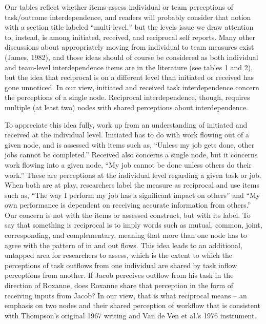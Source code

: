 \documentclass[english,,man]{apa6}
\theoremstyle{definition}
\theoremstyle{definition}
\theoremstyle{definition}
\theoremstyle{remark}
\begin{document}
Our tables reflect whether items assess individual or team perceptions
of task/outcome interdependence, and readers will probably consider that
notion with a section title labeled \enquote{multi-level,} but the
levels issue we draw attention to, instead, is among initiated,
received, and reciprocal self reports. Many other discussions about
appropriately moving from individual to team measures exist (James,
1982), and those ideas should of course be considered as both individual
and team-level interdependence items are in the literature (see tables 1
and 2), but the idea that reciprocal is on a different level than
initiated or received has gone unnoticed. In our view, initiated and
received task interdependence concern the perceptions of a single node.
Reciprocal interdependence, though, requires multiple (at least two)
nodes with shared perceptions about interdependence.

To appreciate this idea fully, work up from an understanding of
initiated and received at the individual level. Initiated has to do with
work flowing out of a given node, and is assessed with items such as,
\enquote{Unless my job gets done, other jobs cannot be completed.}
Received also concerns a single node, but it concerns work flowing into
a given node, \enquote{My job cannot be done unless others do their
work.} These are perceptions at the individual level regarding a given
task or job. When both are at play, researchers label the measure as
reciprocal and use items such as, \enquote{The way I perform my job has
a significant impact on others} and \enquote{My own performance is
dependent on receiving accurate information from others.} Our concern is
not with the items or assessed construct, but with its label. To say
that something is reciprocal is to imply words such as mutual, common,
joint, corresponding, and complementary, meaning that more than one node
has to agree with the pattern of in and out flows. This idea leads to an
additional, untapped area for researchers to assess, which is the extent
to which the perceptions of task outflows from one individual are shared
by task inflow perceptions from another. If Jacob perceives outflow from
his task in the direction of Roxanne, does Roxanne share that perception
in the form of receiving inputs from Jacob? In our view, that is what
reciprocal means -- an emphasis on two nodes and their shared perception
of workflow that is consistent with Thompson's original 1967 writing and
Van de Ven et al.'s 1976 instrument.
\end{document}
